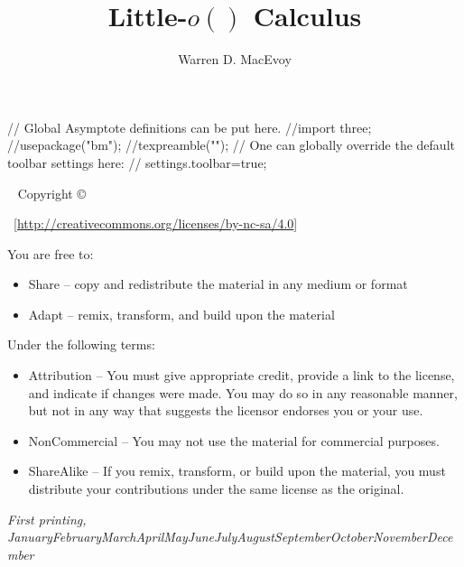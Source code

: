 \documentclass{tufte-book} %
\title{Little-$o()$ Calculus} %
\author[W. MacEvoy]{Warren D. MacEvoy} %
\newcommand{\monthyear}{\ifcase\month\or January\or February\or March\or April\or May\or June\or July\or August\or September\or October\or November\or December\fi\space\number\year} %
\begin{document}
\def\asydir{graphics}
\begin{asydef}
// Global Asymptote definitions can be put here.
//import three;
//usepackage("bm");
//texpreamble("\def\V#1{\bm{#1}}");
// One can globally override the default toolbar settings here:
// settings.toolbar=true;
\end{asydef}
\frontmatter
\maketitle %


\newpage
\begin{fullwidth}
~\vfill
\thispagestyle{empty}
\setlength{\parindent}{0pt}
\setlength{\parskip}{\baselineskip}
Copyright \copyright\ \the\year\ \thanklessauthor

\par{}

\par{}

\par \ccbyncsa\ [\url{http://creativecommons.org/licenses/by-nc-sa/4.0}]

You are free to:
\begin{itemize}
    \item Share -- copy and redistribute the material in any medium or format
    \item Adapt -- remix, transform, and build upon the material
\end{itemize}
Under the following terms:
\begin{itemize}
\item Attribution -- You must give appropriate credit, provide a link to the license, and indicate if changes were made. You may do so in any reasonable manner, but not in any way that suggests the licensor endorses you or your use.
\item NonCommercial -- You may not use the material for commercial purposes.
\item ShareAlike -- If you remix, transform, or build upon the material, you must distribute your contributions under the same license as the original. 
\end{itemize}

\par\textit{First printing, \monthyear}
\end{fullwidth}
\end{document}

